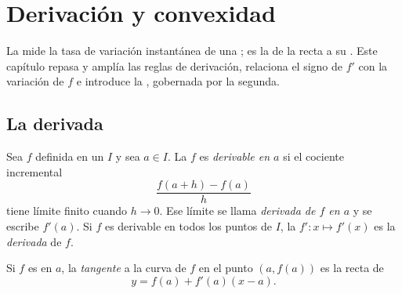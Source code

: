 \chapter{Derivación y convexidad}\label{ch:g12:deriv}

La  mide la tasa de variación instantánea de una ; es la
 de la recta  a su . Este capítulo repasa y amplía
las reglas de derivación, relaciona el signo de $f'$ con la variación de $f$
e introduce la , gobernada por la  segunda.

\section{La derivada}

\begin{definition}\label{def:g12:deriv:derivative}
Sea $f$ definida en un  $I$ y sea $a \in I$. La  $f$ es
\emph{derivable en $a$} si el cociente
incremental
\[
\frac{f(a+h) - f(a)}{h}
\]
tiene límite finito cuando $h \to 0$. Ese límite se llama \emph{derivada de
$f$ en $a$} y se escribe $f'(a)$. Si $f$ es derivable en todos los puntos
de $I$, la  $f' \colon x \mapsto f'(x)$ es la \emph{derivada} de
$f$.
\end{definition}

\begin{definition}\label{def:g12:deriv:tangent}
Si $f$ es  en $a$, la \emph{tangente} a la curva
de $f$ en el punto $(a, f(a))$ es la recta de 
\[
y = f(a) + f'(a)(x - a).
\]
\end{definition}

